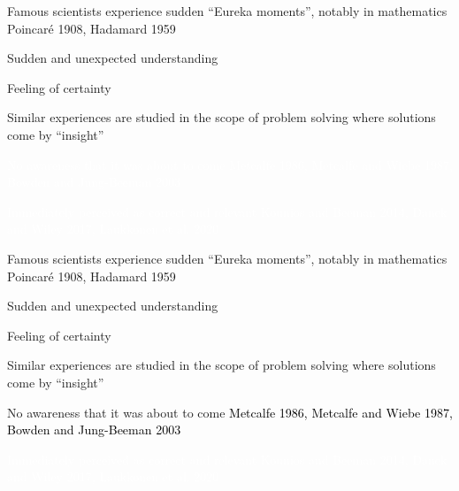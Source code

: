 \documentclass[11pt]{beamer}
\begin{document}
        \begin{frame}

          Famous scientists experience sudden \textcolor{bittersweet}{``Eureka moments''}, notably in mathematics \footnotesize{Poincar\'{e} 1908, Hadamard 1959}

          \normalsize
          
          \textcolor{bittersweet}{Sudden and unexpected understanding}

          \textcolor{bittersweet}{Feeling of certainty}


            Similar experiences are studied in the scope of problem solving where solutions come by ``insight''

            \textcolor{white}{No awareness that it was about to come \footnotesize{Metcalfe 1986, Metcalfe and Wiebe 1987, Bowden and Jung-Beeman 2003}}

            \normalsize

          \textcolor{white}{Immediately perceived as correct and relevant \footnotesize{Kounios and Beeman 2014, Danek and Wiley 2017, Laukkonen et al. 2020} }
 





        \end{frame}
        
         \begin{frame}

          Famous scientists experience sudden \textcolor{bittersweet}{``Eureka moments''}, notably in mathematics \footnotesize{Poincar\'{e} 1908, Hadamard 1959}

          \normalsize
          
          \textcolor{bittersweet}{Sudden and unexpected understanding}

          \textcolor{bittersweet}{Feeling of certainty}


            Similar experiences are studied in the scope of problem solving where solutions come by ``insight''

          \textcolor{bittersweet}{No awareness that it was about to come  \textcolor{black}{\footnotesize{Metcalfe 1986, Metcalfe and Wiebe 1987, Bowden and Jung-Beeman 2003}}}

          \normalsize

          \textcolor{white}{Immediately perceived as correct and relevant \footnotesize{Kounios and Beeman 2014, Danek and Wiley 2017, Laukkonen et al. 2020} }
 





        \end{frame}
\end{document}
